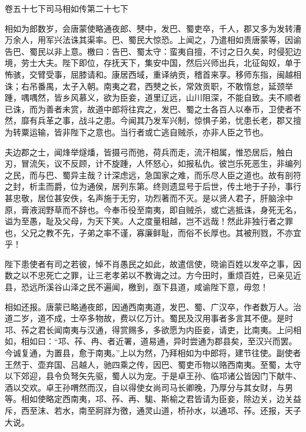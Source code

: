 \documentclass[12pt,UTF8]{ctexbook}
\begin{document}
卷五十七下司马相如传第二十七下



相如为郎数岁，会唐蒙使略通夜郎、僰中，发巴、蜀吏卒，千人，郡又多为发转漕万余人，用军兴法诛其渠率。巴、蜀民大惊恐。上闻之，乃遣相如责唐蒙等，因谕告巴、蜀民以非上意。檄曰：告巴、蜀太守：蛮夷自擅，不讨之日久矣，时侵犯边境，劳士大夫。陛下即位，存抚天下，集安中国，然后兴师出兵，北征匈奴，单于怖骇，交臂受事，屈膝请和。康居西域，重译纳贡，稽首来享。移师东指，闽越相诛；右吊番禺，太子入朝。南夷之君，西僰之长，常效贡职，不敢惰怠，延颈举踵，喁喁然，皆乡风慕义，欲为臣妾，道里辽远，山川阻深，不能自致。夫不顺者已诛，而为善者未赏，故道中郎将往宾之，发巴、蜀之士各百人以奉币，卫使者不然，靡有兵革之事，战斗之患。今闻其乃发军兴制，惊惧子弟，忧患长老，郡又擅为转粟运输，皆非陛下之意也。当行者或亡逃自贼杀，亦非人臣之节也。



夫边郡之士，闻烽举燧燔，皆摄弓而弛，荷兵而走，流汗相属，惟恐居后，触白刃，冒流矢，议不反顾，计不旋踵，人怀怒心，如报私仇。彼岂乐死恶生，非编列之民，而与巴、蜀异主哉？计深虑远，急国家之难，而乐尽人臣之道也。故有剖符之封，析圭而爵，位为通侯，居列东第。终则遗显号于后世，传土地于子孙，事行甚忠敬，居位甚安佚，名声施于无穷，功烈著而不灭。是以贤人君子，肝脑涂中原，膏液润野草而不辞也。今奉币役至南夷，即自贼杀，或亡逃抵诛，身死无名，谥为至愚，耻及父母，为天下笑。人之度量相越，岂不远哉！然此非独行者之罪也，父兄之教不先，子弟之率不谨，寡廉鲜耻，而俗不长厚也。其被刑戮，不亦宜乎！



陛下患使者有司之若彼，悼不肖愚民之如此，故遣信使，晓谕百姓以发卒之事，因数之以不忠死亡之罪，让三老孝弟以不教诲之过。方今田时，重烦百姓，已亲见近县，恐远所溪谷山泽之民不遍闻，檄到，亟下县道，咸谕陛下意，毋忽！



相如还报。唐蒙已略通夜郎，因通西南夷道，发巴、蜀、广汉卒，作者数万人。治道二岁，道不成，士卒多物故，费以亿万计。蜀民及汉用事者多言其不便。是时邛、莋之君长闻南夷与汉通，得赏赐多，多欲愿为内臣妾，请吏，比南夷。上问相如，相如曰：“邛、莋、冉、者近署，道易通，异时尝通为郡县矣，至汉兴而罢。今诚复通，为置县，愈于南夷。”上以为然，乃拜相如为中郎将，建节往使。副使者王然于、壶弃国、吕越人，驰四乘之传，因巴、蜀吏币物以赂西南夷。至蜀，太守以下郊迎，县令负弩矢先驱，蜀人以为宠。于是卓王孙、临邛诸公皆因门下献牛、酒以交欢。卓王孙喟然而汉，自以得使女尚司马长卿晚，乃厚分与其女财，与男等。相如使略定西南夷，邛、莋、再、駹、斯榆之君皆请为臣妾，除边关，边关益斥，西至沫、若水，南至牁牂为徼，通灵山道，桥孙水，以通邛、莋。还报，天子大说。
\end{document}
